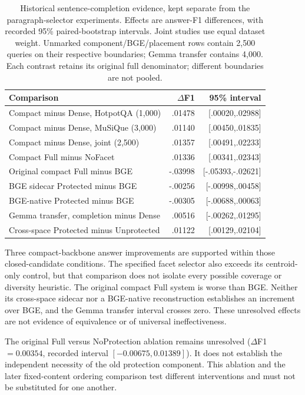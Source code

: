 \documentclass[pdflatex,sn-mathphys-num]{sn-jnl}
\begin{document}
\begin{table}[t]\centering\small
\caption{Historical sentence-completion evidence, kept separate from the
paragraph-selector experiments. Effects are answer-F1 differences, with
recorded 95\% paired-bootstrap intervals. Joint studies use equal dataset
weight. Unmarked component/BGE/placement rows contain 2,500 queries on their
respective boundaries; Gemma transfer contains 4,000. Each contrast retains
its original full denominator; different boundaries are not pooled.}
\label{tab:history}
\begin{tabular}{p{.52\linewidth}rr}\toprule
Comparison & $\Delta$F1 & 95\% interval\\\midrule
Compact minus Dense, HotpotQA (1,000) & .01478 & [.00020,.02988]\\
Compact minus Dense, MuSiQue (3,000) & .01140 & [.00450,.01835]\\
Compact minus Dense, joint (2,500) & .01357 & [.00491,.02233]\\
Compact Full minus NoFacet & .01336 & [.00341,.02343]\\
Original compact Full minus BGE & -.03998 & [-.05393,-.02621]\\
BGE sidecar Protected minus BGE & -.00256 & [-.00998,.00458]\\
BGE-native Protected minus BGE & -.00305 & [-.00688,.00063]\\
Gemma transfer, completion minus Dense & .00516 & [-.00262,.01295]\\
Cross-space Protected minus Unprotected & .01122 & [.00129,.02104]\\\bottomrule
\end{tabular}
\end{table}

Three compact-backbone answer improvements are supported within those
closed-candidate conditions. The specified facet selector also exceeds its
centroid-only control, but that comparison does not isolate every possible
coverage or diversity heuristic. The original compact Full system is worse
than BGE. Neither its cross-space sidecar nor a BGE-native reconstruction
establishes an increment over BGE, and the Gemma transfer interval crosses
zero. These unresolved effects are not evidence of equivalence or of
universal ineffectiveness.

The original Full versus NoProtection ablation remains unresolved
($\Delta$F1 $=0.00354$, recorded interval $[-0.00675,0.01389]$). It does not
establish the independent necessity of the old protection component. This
ablation and the later fixed-content ordering comparison test different
interventions and must not be substituted for one another.
\end{document}
